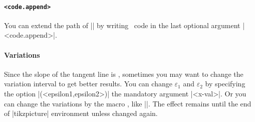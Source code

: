 \paragraph{\texttt{<code.append>}}
You can extend the path of |\tztangentat| by writing \Tikz\ code in the last optional argument |<code.append>|.

\begin{tzcode}{.3}
\end{tzcode}



\paragraph{Variations}
Since the slope of the tangent line is , sometimes you may want to change the variation interval to get better results.
You can change $\varepsilon_1$ and $\varepsilon_2$ by specifying the option |(<epsilon1,epsilon2>)|  the mandatory argument |{<x-val>}|.
Or you can change the variations by the macro \icmd{\settztangentepsilon},
like ||. The effect remains until the end of |tikzpicture| environment unless changed again.

\begin{tzcode}{.3}
\end{tzcode}




\subsection{\protect\cmd{\tztangent}}
\label{ss:tztangent}


